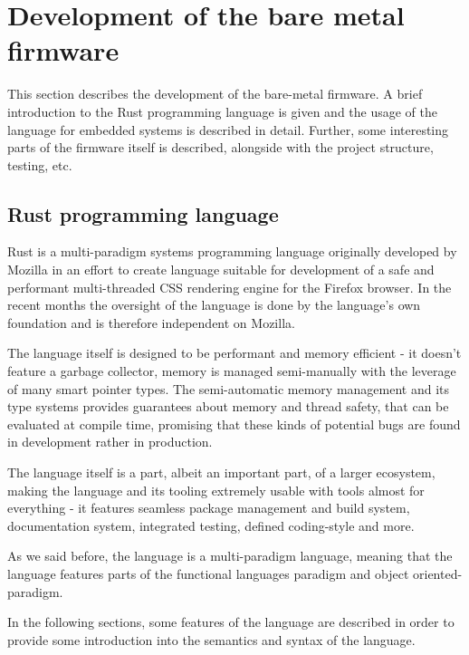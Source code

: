 \section{Development of the bare metal firmware}
\label{sec:firmware}
This section describes the development of the bare-metal firmware.
A brief introduction to the Rust programming language is given and the usage of the language for embedded systems is described in detail.
Further, some interesting parts of the firmware itself is described, alongside with the project structure, testing, etc.

\subsection{Rust programming language}
\label{subsec:rust}
Rust is a multi-paradigm systems programming language originally developed by Mozilla\cite{rust_authorship} in an effort to create language suitable for development of a safe and performant multi-threaded CSS rendering engine for the Firefox browser\cite{servo}.
In the recent months the oversight of the language is done by the language's own foundation and is therefore independent on Mozilla\cite{rust_foundation}.

The language itself is designed to be performant and memory efficient - it doesn't feature a garbage collector, memory is managed semi-manually with the leverage of many smart pointer types.
The semi-automatic memory management and its type systems provides guarantees about memory and thread safety, that can be evaluated at compile time, promising that these kinds of potential bugs are found in development rather in production.


The language itself is a part, albeit an important part, of a larger ecosystem, making the language and its tooling extremely usable with tools almost for everything - it features seamless package management and build system, documentation system, integrated testing, defined coding-style and more.

As we said before, the language is a multi-paradigm language, meaning that the language features parts of the functional languages paradigm and object oriented-paradigm.


In the following sections, some features of the language are described in order to provide some introduction into the semantics and syntax of the language.
\newpage
